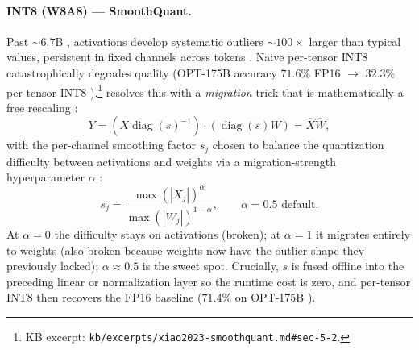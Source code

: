 \paragraph{INT8 (W8A8) --- SmoothQuant.}
Past $\sim 6.7$B ,  activations develop systematic
outliers $\sim 100\times$ larger than typical values, persistent in
fixed channels across tokens \citep[\S 3]{xiao2023-smoothquant}. Naive
per-tensor INT8 catastrophically degrades quality (OPT-175B accuracy
$71.6\%$ FP16 $\to$ $32.3\%$ per-tensor INT8
\citep[\S 5.2, Table~1]{xiao2023-smoothquant}).\footnote{KB excerpt:
\nolinkurl{kb/excerpts/xiao2023-smoothquant.md#sec-5-2}.}
\citet{xiao2023-smoothquant} resolves this with a \emph{migration}
trick that is mathematically a free rescaling
\citep[\S 4, Eq.~3]{xiao2023-smoothquant}:
\begin{equation}
Y = (X \operatorname{diag}(s)^{-1}) \cdot (\operatorname{diag}(s) W) = \hat{X}\hat{W},
\label{eq:smoothquant-eq}
\end{equation}
with the per-channel smoothing factor $s_j$ chosen to balance the
quantization difficulty between activations and weights via a
migration-strength hyperparameter $\alpha$
\citep[\S 4, Eq.~4]{xiao2023-smoothquant}:
\begin{equation}
s_j = \frac{\max(|X_j|)^{\alpha}}{\max(|W_j|)^{1-\alpha}},
\qquad \alpha = 0.5 \text{ default}.
\label{eq:smoothquant-s}
\end{equation}
At $\alpha = 0$ the difficulty stays on activations (broken); at
$\alpha = 1$ it migrates entirely to weights (also broken because
weights now have the outlier shape they previously lacked); $\alpha
\approx 0.5$ is the sweet spot. Crucially, $s$ is fused offline into
the preceding linear or normalization layer so the runtime cost is
zero, and per-tensor INT8 then recovers the FP16 baseline ($71.4\%$ on
OPT-175B \citep[\S 5.2, Table~1]{xiao2023-smoothquant}).

